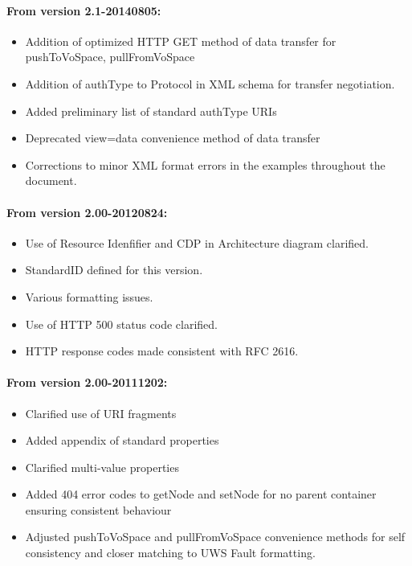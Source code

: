\documentclass[11pt,a4paper]{ivoa}
\begin{document}
\paragraph{From version 2.1-20140805:}
\begin{itemize}
    \item Addition of optimized HTTP GET method of data transfer for pushToVoSpace, pullFromVoSpace
    \item Addition of authType to Protocol in XML schema for transfer negotiation.
    \item Added preliminary list of standard authType URIs
    \item Deprecated view=data convenience method of data transfer
    \item Corrections to minor XML format errors in the examples throughout the document.
\end{itemize}

\paragraph{From version 2.00-20120824:}
\begin{itemize}
    \item Use of Resource Idenfifier and CDP in Architecture diagram clarified.
    \item StandardID defined for this version.
    \item Various formatting issues.
    \item Use of HTTP 500 status code clarified.
    \item HTTP response codes made consistent with RFC 2616.
\end{itemize}

\paragraph{From version 2.00-20111202:}
\begin{itemize}
    \item Clarified use of URI fragments
    \item Added appendix of standard properties
    \item Clarified multi-value properties
    \item Added 404 error codes to getNode and setNode for no parent container ensuring consistent behaviour
    \item Adjusted pushToVoSpace and pullFromVoSpace convenience methods for self consistency and closer matching to UWS Fault formatting.
\end{itemize}
\end{document}
